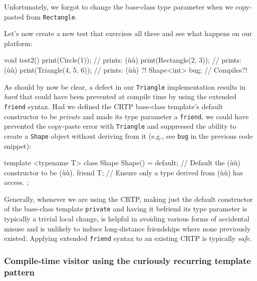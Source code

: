 \noindent Unfortunately, we forgot to change the base-class type parameter when we
copy-pasted from \lstinline!Rectangle!.

Let's now create a new test that exercises all three and see what
happens on our platform:

\begin{emcppslisting}[emcppsbatch=e7]
void test2()
{
    print(Circle(1));          // prints: (ù{}ù)
    print(Rectangle(2, 3));    // prints: (ù{}ù)
    print(Triangle(4, 5, 6));  // prints: (ù{}ù) ?!
    Shape<int> bug;            // Compiles?!
}
\end{emcppslisting}
    
\noindent As should by now be clear, a defect in our \lstinline!Triangle!
implementation results in \emph{hard}  that
could have been prevented at compile time by using the extended
\lstinline!friend! syntax. Had we defined the CRTP base-class template's
default constructor to be \emph{private} and made its type parameter a
\lstinline!friend!, we could have prevented the copy-paste error with
\lstinline!Triangle! and suppressed the ability to create a \lstinline!Shape!
object without deriving from it (e.g., see \lstinline!bug! in the previous
code snippet):

\begin{emcppslisting}[emcppsbatch=e8]
template <typename T>
class Shape
{
    Shape() = default;  // Default the (ù{}ù) constructor to be (ù{}ù).
    friend T;           // Ensure only a type derived from (ù{}ù) has access.
};
\end{emcppslisting}
    
\noindent Generally, whenever we are using the CRTP, making just the
default constructor of the base-class template \lstinline!private! and
having it befriend its type parameter is typically a trivial local
change, is helpful in avoiding various forms of accidental misuse and
is unlikely to induce long-distance friendships where none previously
existed: Applying extended \lstinline!friend! syntax to an existing CRTP
is typically \emph{safe}.

\subsubsection[Compile-time visitor using the curiously recurring template pattern]{Compile-time visitor using the curiously recurring template pattern}\label{compile-time-visitor-using-crtp}

